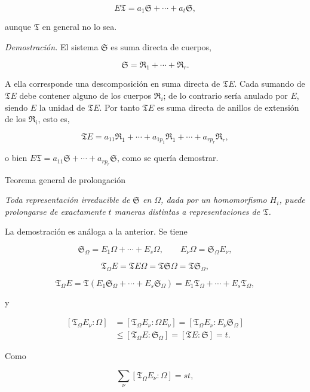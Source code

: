 \[
E\mathfrak T=a_1\mathfrak S+\cdots+a_t\mathfrak S,
\]

aunque $\mathfrak T$ en general no lo sea.

\emph{Demostración.} El sistema $\mathfrak S$ es suma directa de cuerpos,

\[
\mathfrak S=\mathfrak R_1+\cdots+\mathfrak R_r.
\]

A ella corresponde una descomposición en suma directa de $\mathfrak T E$. Cada sumando de $\mathfrak T E$ debe contener alguno de los cuerpos $\mathfrak R_i$; de lo contrario sería anulado por $E$, siendo $E$ la unidad de $\mathfrak T E$. Por tanto $\mathfrak T E$ es suma directa de anillos de extensión de los $\mathfrak R_i$, esto es,

\[
\mathfrak T E=a_{11}\mathfrak R_1+\cdots+a_{1p_1}\mathfrak R_1
+\cdots+a_{rp_r}\mathfrak R_r,
\]

o bien $E\mathfrak T=a_{11}\mathfrak S+\cdots+a_{rp_r}\mathfrak S$, como se quería demostrar.

\begin{center}
Teorema general de prolongación
\end{center}

\emph{Toda representación irreducible de $\mathfrak S$ en $\Omega$, dada por un homomorfismo $H_i$, puede prolongarse de exactamente $t$ maneras distintas a representaciones de $\mathfrak T$.}

La demostración es análoga a la anterior. Se tiene

\[
\mathfrak S_\Omega=E_1\Omega+\cdots+E_s\Omega,
\qquad E_\nu\Omega=\mathfrak S_\Omega E_\nu,
\]

\[
\mathfrak T_\Omega E=\mathfrak T E\Omega
=\mathfrak T\mathfrak S\Omega=\mathfrak T\mathfrak S_\Omega,
\]

\[
\mathfrak T_\Omega E
=\mathfrak T(E_1\mathfrak S_\Omega+\cdots+E_s\mathfrak S_\Omega)
=E_1\mathfrak T_\Omega+\cdots+E_s\mathfrak T_\Omega,
\]

y

\[
\begin{aligned}
[\mathfrak T_\Omega E_\nu:\Omega]
&=[\mathfrak T_\Omega E_\nu:\Omega E_\nu]
=[\mathfrak T_\Omega E_\nu:E_\nu\mathfrak S_\Omega]\\
&\leq[\mathfrak T_\Omega E:\mathfrak S_\Omega]
=[\mathfrak T E:\mathfrak S]=t.
\end{aligned}
\]

Como

\[
\sum_\nu[\mathfrak T_\Omega E_\nu:\Omega]=st,
\]

